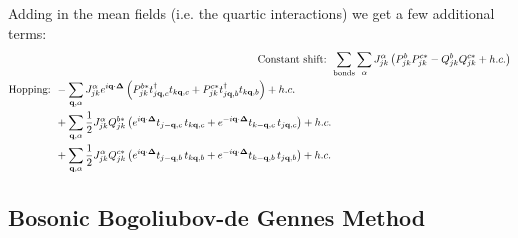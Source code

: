     Adding in the mean fields (i.e. the quartic interactions) we get a few additional terms:
    \begin{align}
        \textup{Constant shift: } &  
        \sum_{\textup{bonds}}\sum_{\alpha} J^\alpha _{jk} \left(
        P_{jk}^{b}P_{jk}^{c*}- 
        Q_{jk}^{b}Q_{jk}^{c*} + h.c.
        \right)
    \\
        \begin{split}
        \textup{Hopping: } &
        -\sum_{\textbf q,\alpha}
        J^\alpha _{jk} e^{i \textbf q \cdot \bm \Delta}
        \left( P^{b*}_{jk} t^\dag_{j \textbf q, c}t_{k \textbf q,c} + P^{c*}_{jk} t^\dag_{j \textbf q, b}t_{k \textbf q,b}\right) + h.c. \\
        & + \sum_{\textbf q,\alpha} \frac{1}{2} J^\alpha _{jk}
        Q_{jk}^{b*} \left ( 
        e^{i \textbf q \cdot \bm \Delta} t_{j -\textbf q, c}\, t_{k \textbf q, c}
        + e^{-i \textbf q \cdot \bm \Delta} t_{k -\textbf q, c}\, t_{j \textbf q, c}
        \right ) + h.c. \\
         & + \sum_{\textbf q,\alpha}\frac{1}{2} J^\alpha _{jk}
        Q_{jk}^{c*} \left ( 
        e^{i \textbf q \cdot \bm \Delta} t_{j -\textbf q, b}\, t_{k \textbf q, b}
        + e^{-i \textbf q \cdot \bm \Delta} t_{k -\textbf q, b}\, t_{j \textbf q, b}
        \right ) + h.c. 
    \end{split}
\end{align}


\subsection{Bosonic Bogoliubov-de Gennes Method}

